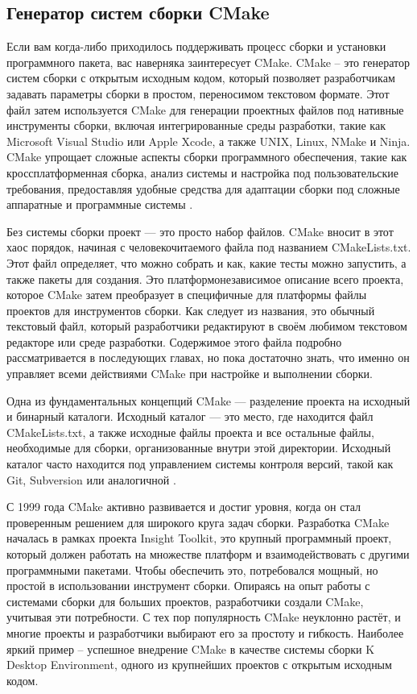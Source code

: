 \subsection{Генератор систем сборки CMake}

Если вам когда-либо приходилось поддерживать процесс сборки и установки программного пакета, вас наверняка заинтересует CMake. CMake -- это генератор систем сборки с открытым исходным кодом, который позволяет разработчикам задавать параметры сборки в простом, переносимом текстовом формате. Этот файл затем используется CMake для генерации проектных файлов под нативные инструменты сборки, включая интегрированные среды разработки, такие как Microsoft Visual Studio или Apple Xcode, а также UNIX, Linux, NMake и Ninja. CMake упрощает сложные аспекты сборки программного обеспечения, такие как кроссплатформенная сборка, анализ системы и настройка под пользовательские требования, предоставляя удобные средства для адаптации сборки под сложные аппаратные и программные системы \cite{CMake}.

Без системы сборки проект — это просто набор файлов. CMake вносит в этот хаос порядок, начиная с человекочитаемого файла под названием CMakeLists.txt. Этот файл определяет, что можно собрать и как, какие тесты можно запустить, а также пакеты для создания. Это платформонезависимое описание всего проекта, которое CMake затем преобразует в специфичные для платформы файлы проектов для инструментов сборки. Как следует из названия, это обычный текстовый файл, который разработчики редактируют в своём любимом текстовом редакторе или среде разработки. Содержимое этого файла подробно рассматривается в последующих главах, но пока достаточно знать, что именно он управляет всеми действиями CMake при настройке и выполнении сборки.

Одна из фундаментальных концепций CMake — разделение проекта на исходный и бинарный каталоги. Исходный каталог — это место, где находится файл CMakeLists.txt, а также исходные файлы проекта и все остальные файлы, необходимые для сборки, организованные внутри этой директории. Исходный каталог часто находится под управлением системы контроля версий, такой как Git, Subversion или аналогичной \cite{Professional_CMake}.

С 1999 года CMake активно развивается и достиг уровня, когда он стал проверенным решением для широкого круга задач сборки. Разработка CMake началась в рамках проекта Insight Toolkit, это крупный программный проект, который должен работать на множестве платформ и взаимодействовать с другими программными пакетами. Чтобы обеспечить это, потребовался мощный, но простой в использовании инструмент сборки. Опираясь на опыт работы с системами сборки для больших проектов, разработчики создали CMake, учитывая эти потребности. С тех пор популярность CMake неуклонно растёт, и многие проекты и разработчики выбирают его за простоту и гибкость. Наиболее яркий пример -- успешное внедрение CMake в качестве системы сборки K Desktop Environment, одного из крупнейших проектов с открытым исходным кодом.

